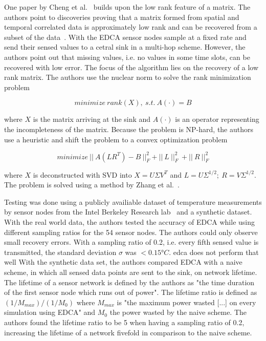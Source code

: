 One paper by Cheng et al.~\cite{cheng2010efficient} builds upon the low rank
feature of a matrix. The authors point to discoveries proving that a matrix
formed from spatial and temporal correlated data is approximately low rank and
can be recovered from a subset of the data~\cite{vuran2004spatio,
candes2009exact}. With the \ac{EDCA} sensor nodes sample at a fixed rate and
send their sensed values to a cetral sink in a multi-hop scheme. However, the
authors point out that missing values, i.e. no values in some time slots, can
be recovered with low error. The focus of the algorithm lies on the recovery of
a low rank
matrix. The authors use the nuclear norm to solve the rank minimization problem

$$
minimize \ rank(X), \ s.t. \ A(\cdot)=B
$$

where $ X $ is the matrix arriving at the sink and $ A(\cdot) $ is an operator
representing the incompleteness of the matrix. Because the problem is NP-hard,
the authors use a heuristic and shift the problem to a convex optimization
problem

$$
minimize \ || \ A(LR^T) - B \ ||^2_F + || \ L \ ||^2_F \ + || \ R \ ||^2_F
$$

where $ X $ is deconstructed with \ac{SVD} into $ X = U \Sigma V^T $ and $ L =
U\Sigma^{1/2}; \ R = V\Sigma^{1/2}$. The problem is solved using a method by
Zhang et al.~\cite{zhang2009spatio}.

Testing was done using a publicly availiable dataset of temperature
measurements by sensor nodes from the Intel Berkeley Research
lab~\cite{labdata} and a synthetic dataset. With the real world data, the
authors tested the accuracy of \ac{EDCA} while using different sampling ratios
for the 54 sensor nodes. The authors could only observe small recovery errors.
With a sampling ratio of 0.2, i.e. every fifth sensed value is transmitted, the
standard deviation $ \sigma $ was $ < 0.15°C $. %
edca does not perform that well With the synthetic data set, the authors
compared \ac{EDCA} with a naive scheme, in which all sensed data points are
sent to the sink, on network lifetime. The lifetime of a sensor network is
defined by the authors as "the time duration of the first sensor node which
runs out of power". The lifetime ratio is defined as $ (1/M_{max}) / (1/M_0) $
where $ M_{max} $ is "the maximum power wasted [...] on every simulation using
\ac{EDCA}" and $ M_0 $ the power wasted by the naive scheme. The authors found
the lifetime ratio to be 5 when having a sampling ratio of 0.2, increasing the
lifetime of a network fivefold in comparison to the naive scheme.


